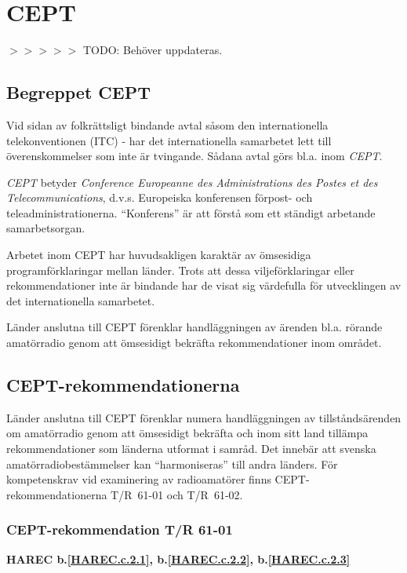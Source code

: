 \section{CEPT}

$>>>>>$ TODO: Behöver uppdateras.

\subsection{Begreppet CEPT}

Vid sidan av folkrättsligt bindande avtal såsom den internationella
telekonventionen (ITC) - har det internationella samarbetet lett till
överenskommelser som inte är tvingande. Sådana avtal görs bl.a. inom
\emph{CEPT}.

\emph{CEPT} betyder \emph{Conference Europeanne des Administrations
  des Postes et des Telecommunications}, d.v.s. Europeiska konferensen
förpost- och teleadministrationerna. ``Konferens'' är att förstå som
ett ständigt arbetande samarbetsorgan.

Arbetet inom CEPT har huvudsakligen karaktär av ömsesidiga
programförklaringar mellan länder. Trots att dessa viljeförklaringar
eller rekommendationer inte är bindande har de visat sig värdefulla
för utvecklingen av det internationella samarbetet.

Länder anslutna till CEPT förenklar handläggningen av ärenden
bl.a. rörande amatörradio genom att ömsesidigt bekräfta
rekommendationer inom området.

\subsection{CEPT-rekommendationerna}

Länder anslutna till CEPT förenklar numera handläggningen av
tillståndsärenden om amatörradio genom att ömsesidigt bekräfta och
inom sitt land tillämpa rekommendationer som länderna utformat i
samråd. Det innebär att svenska amatörradiobestämmelser kan
``harmoniseras'' till andra länders.  För kompetenskrav vid
examinering av radioamatörer finns CEPT-rekommendationerna T/R~61-01
och T/R~61-02.

\subsubsection{CEPT-rekommendation T/R 61-01}
\textbf{
HAREC b.\ref{HAREC.c.2.1}\label{myHAREC.c.2.1},
 b.\ref{HAREC.c.2.2}\label{myHAREC.c.2.2},
 b.\ref{HAREC.c.2.3}\label{myHAREC.c.2.3}
}

